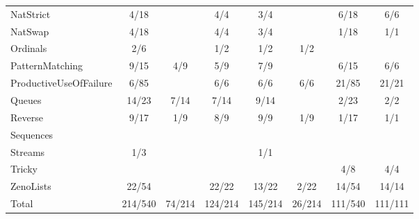 \begin{tabular}{>{\footnotesize}l || >{\footnotesize}c | >{\footnotesize}c | >{\footnotesize}c | >{\footnotesize}c | >{\footnotesize}c || >{\footnotesize}c | >{\footnotesize}c}
NatStrict                  & 4/18 &  & 4/4 & 3/4 &  & 6/18 & 6/6\\
NatSwap                    & 4/18 &  & 4/4 & 3/4 &  & 1/18 & 1/1\\
Ordinals                   & 2/6 &  & 1/2 & 1/2 & 1/2 &  & \\
PatternMatching            & 9/15 & 4/9 & 5/9 & 7/9 &  & 6/15 & 6/6\\
ProductiveUseOfFailure     & 6/85 &  & 6/6 & 6/6 & 6/6 & 21/85 & 21/21\\
Queues                     & 14/23 & 7/14 & 7/14 & 9/14 &  & 2/23 & 2/2\\
Reverse                    & 9/17 & 1/9 & 8/9 & 9/9 & 1/9 & 1/17 & 1/1\\
Sequences                  &  &  &  &  &  &  & \\
Streams                    & 1/3 &  &  & 1/1 &  &  & \\
Tricky                     &  &  &  &  &  & 4/8 & 4/4\\
ZenoLists                  & 22/54 &  & 22/22 & 13/22 & 2/22 & 14/54 & 14/14\\
\hline
Total                      & 214/540 & 74/214 & 124/214 & 145/214 & 26/214 & 111/540 & 111/111\\
\end{tabular}
%
